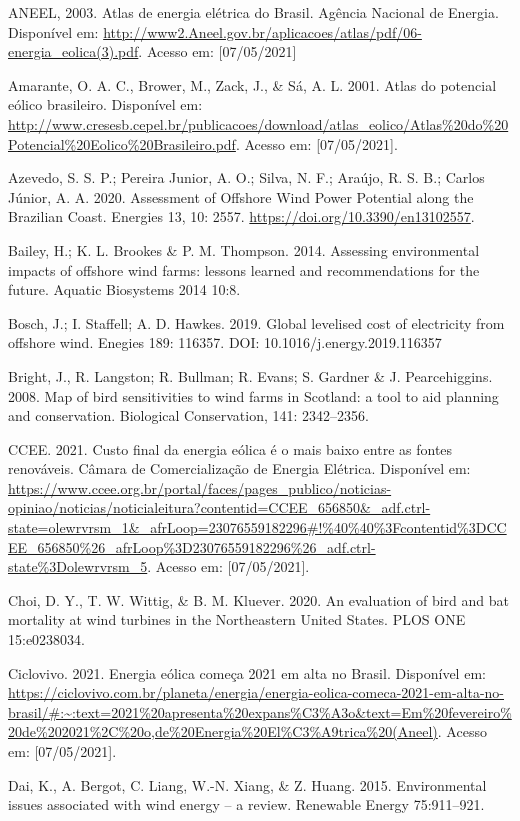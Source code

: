 \documentclass[
  oneside]{scrbook}
\begin{document}
ANEEL, 2003. Atlas de energia elétrica do Brasil. Agência Nacional de Energia. Disponível em: \url{http://www2.Aneel.gov.br/aplicacoes/atlas/pdf/06-energia_eolica(3).pdf}. Acesso em: {[}07/05/2021{]}

Amarante, O. A. C., Brower, M., Zack, J., \& Sá, A. L. 2001. Atlas do potencial eólico brasileiro. Disponível em: \url{http://www.cresesb.cepel.br/publicacoes/download/atlas_eolico/Atlas\%20do\%20Potencial\%20Eolico\%20Brasileiro.pdf}. Acesso em: {[}07/05/2021{]}.

Azevedo, S. S. P.; Pereira Junior, A. O.; Silva, N. F.; Araújo, R. S. B.; Carlos Júnior, A. A. 2020. Assessment of Offshore Wind Power Potential along the Brazilian Coast. Energies 13, 10: 2557. \url{https://doi.org/10.3390/en13102557}.

Bailey, H.; K. L. Brookes \& P. M. Thompson. 2014. Assessing environmental impacts of offshore wind farms: lessons learned and recommendations for the future. Aquatic Biosystems 2014 10:8.

Bosch, J.; I. Staffell; A. D. Hawkes. 2019. Global levelised cost of electricity from offshore wind. Enegies 189: 116357. DOI: 10.1016/j.energy.2019.116357

Bright, J., R. Langston; R. Bullman; R. Evans; S. Gardner \& J. Pearcehiggins. 2008. Map of bird sensitivities to wind farms in Scotland: a tool to aid planning and conservation. Biological Conservation, 141: 2342--2356.

CCEE. 2021. Custo final da energia eólica é o mais baixo entre as fontes renováveis. Câmara de Comercialização de Energia Elétrica. Disponível em: \url{https://www.ccee.org.br/portal/faces/pages_publico/noticias-opiniao/noticias/noticialeitura?contentid=CCEE_656850\&_adf.ctrl-state=olewrvrsm_1\&_afrLoop=23076559182296\#!\%40\%40\%3Fcontentid\%3DCCEE_656850\%26_afrLoop\%3D23076559182296\%26_adf.ctrl-state\%3Dolewrvrsm_5}. Acesso em: {[}07/05/2021{]}.

Choi, D. Y., T. W. Wittig, \& B. M. Kluever. 2020. An evaluation of bird and bat mortality at wind turbines in the Northeastern United States. PLOS ONE 15:e0238034.

Ciclovivo. 2021. Energia eólica começa 2021 em alta no Brasil. Disponível em: \url{https://ciclovivo.com.br/planeta/energia/energia-eolica-comeca-2021-em-alta-no-brasil/\#:~:text=2021\%20apresenta\%20expans\%C3\%A3o\&text=Em\%20fevereiro\%20de\%202021\%2C\%20o,de\%20Energia\%20El\%C3\%A9trica\%20(Aneel)}. Acesso em: {[}07/05/2021{]}.

Dai, K., A. Bergot, C. Liang, W.-N. Xiang, \& Z. Huang. 2015. Environmental issues associated with wind energy -- a review. Renewable Energy 75:911--921.
\end{document}
